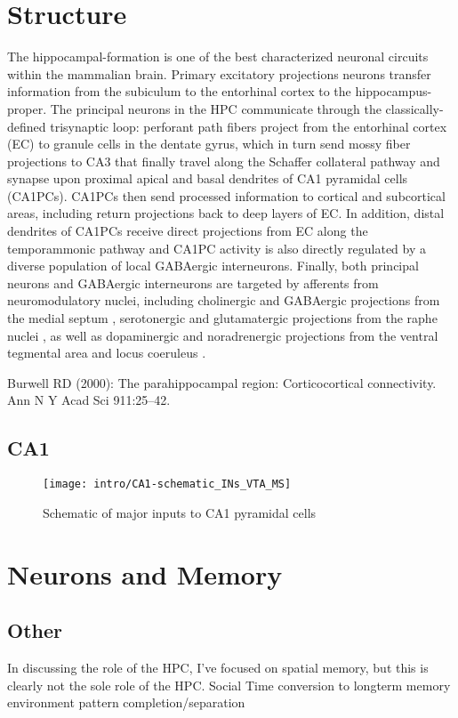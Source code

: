 \section{Structure}\label{sec:intro:hpc:structure}
The hippocampal-formation is one of the best characterized neuronal circuits within the mammalian brain.
Primary excitatory projections neurons transfer information from the subiculum to the entorhinal cortex to the hippocampus-proper.
The principal neurons in the \ac{HPC} communicate through the classically-defined trisynaptic loop: perforant path fibers project from the entorhinal cortex (EC) to granule cells in the dentate gyrus, which in turn send mossy fiber projections to CA3 that finally travel along the Schaffer collateral pathway and synapse upon proximal apical and basal dendrites of CA1 pyramidal cells (CA1PCs).
CA1PCs then send processed information to cortical and subcortical areas, including return projections back to deep layers of EC.
In addition, distal dendrites of CA1PCs receive direct projections from EC along the temporammonic pathway and CA1PC activity is also directly regulated by a diverse population of local GABAergic interneurons.
Finally, both principal neurons and GABAergic interneurons are targeted by afferents from neuromodulatory nuclei, including cholinergic and GABAergic projections from the medial septum  \citep{Klausberger2008}, serotonergic and glutamatergic projections from the raphe nuclei \citep{Varga2009}, as well as dopaminergic and noradrenergic projections from the ventral tegmental area \citep{Gasbarri1997} and locus coeruleus \citep{Foote1983}.


Burwell RD (2000): The parahippocampal region: Corticocortical connectivity. Ann N Y Acad Sci 911:25–42.
\subsection{CA1}
\begin{figure}
	\centering
	\texttt{[image: intro/CA1-schematic\_INs\_VTA\_MS]}
	\caption{Schematic of major inputs to CA1 pyramidal cells}
	\label{fig:intro:hpc:CA1_schematic}
\end{figure}

\section{Neurons and Memory}\label{sec:intro:hpc:physiology}


\subsection{Other}
In discussing the role of the \ac{HPC}, I've focused on spatial memory, but this is clearly not the sole role of the \ac{HPC}.
Social
Time
conversion to longterm memory
environment
pattern completion/separation

